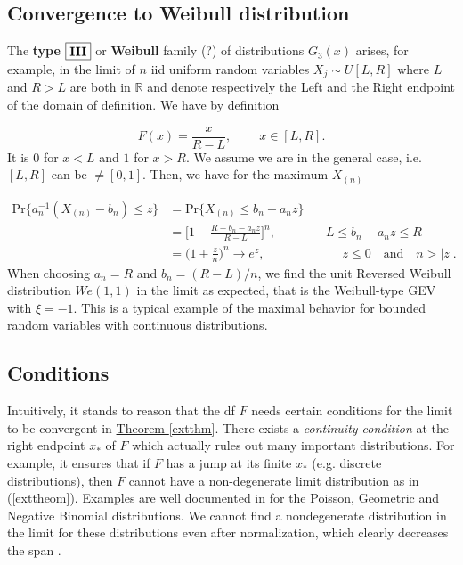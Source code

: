 \subsection*{Convergence to Weibull distribution}

The \textbf{type}  $\boxed{\textbf{\text{III}}}$ or \textbf{Weibull} family (?) of distributions $G_3(x)$ arises, for example, in the limit of $n$ iid uniform random variables $X_j\sim U[L,R]$ where $L$ and $R>L$ are both in $\mathbb{R}$  and denote respectively the Left and the Right endpoint of the domain of definition. We have by definition

\begin{equation*}
F(x)=\frac{x}{R-L}, \ \ \ \ \ \ \ \  \ \ x\in [L,R].
\end{equation*}
It is $0$ for $x<L$ and $1$ for $x>R$.
We assume we are in the general case, i.e. $[L,R]$ can be $\neq [0,1]$. Then, we have for the maximum $X_{(n)}$

\begin{equation*}
\begin{aligned}
\text{Pr}\{a_n^{-1}(X_{(n)}-b_n)\leq z\}
&=\text{Pr}\{X_{(n)}\leq b_n+a_nz\} \\
& = \bigg[1-\frac{R-b_n-a_nz}{R-L}\bigg]^n, \qquad\qquad L\leq b_n+a_nz\leq R \\ 
& = \Big(1+\frac{z}{n}\Big)^n\to e^z, \ \qquad \qquad\qquad  z\leq 0 \quad \text{and} \quad n>|z|.
\end{aligned}
\end{equation*}
When choosing $a_n=R$ and $b_n=(R-L)/n$, we find the unit Reversed Weibull distribution $We(1,1)$ in the limit as expected, that is the Weibull-type GEV with $\xi=-1$.
 This is a typical example of the maximal behavior for bounded random variables with
continuous distributions.


\subsection*{Conditions}

Intuitively, it stands to reason that the df $F$ needs certain conditions for the limit to be convergent in \hyperref[extthm]{Theorem \ref{extthm}}. There exists a \emph{continuity condition} at the right endpoint $x_*$ of $F$ which actually rules out many important distributions. For example, it ensures that if $F$ has a jump at its finite $x_*$ (e.g. discrete distributions), then $F$ cannot have a non-degenerate limit distribution as in (\ref{exttheom}). Examples are well documented in \citet[section 3.1]{embrechts_modelling_2011} for the Poisson, Geometric and Negative Binomial distributions. We cannot find a nondegenerate distribution in the limit for these distributions even after normalization, which clearly decreases the span . 


